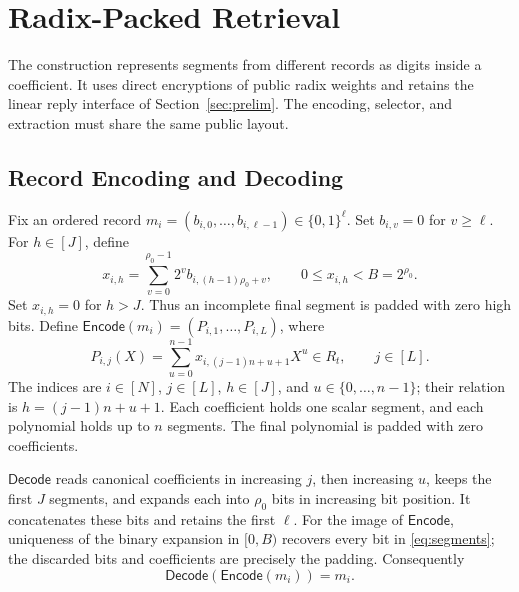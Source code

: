 \section{Radix-Packed Retrieval}
\label{sec:proposal}
The construction represents segments from different records as digits
inside a coefficient. It uses direct encryptions of public radix weights
and retains the linear reply interface of Section~\ref{sec:prelim}.
The encoding, selector, and extraction must share the same public layout.
\subsection{Record Encoding and Decoding}
\label{sec:encoding}
Fix an ordered record \(m_i=(b_{i,0},\ldots,b_{i,\ell-1})\in\{0,1\}^{\ell}\).
Set \(b_{i,v}=0\) for \(v\ge\ell\). For \(h\in[J]\), define
\begin{equation}
\label{eq:segments}
 x_{i,h}=\sum_{v=0}^{\rho_0-1}2^v b_{i,(h-1)\rho_0+v},\qquad
 0\le x_{i,h}<B=2^{\rho_0}.
\end{equation}
Set \(x_{i,h}=0\) for \(h>J\). Thus an incomplete final segment is padded
with zero high bits. Define \(\mathsf{Encode}(m_i)=(P_{i,1},\ldots,P_{i,L})\),
where
\begin{equation}
\label{eq:encode}
 P_{i,j}(X)=\sum_{u=0}^{n-1}x_{i,(j-1)n+u+1}X^u\in R_t,
 \qquad j\in[L].
\end{equation}
The indices are \(i\in[N]\), \(j\in[L]\), \(h\in[J]\), and
\(u\in\{0,\ldots,n-1\}\); their relation is \(h=(j-1)n+u+1\).
Each coefficient holds one scalar segment, and each polynomial holds up to
\(n\) segments. The final polynomial is padded with zero coefficients.

\(\mathsf{Decode}\) reads canonical coefficients in increasing \(j\), then
increasing \(u\), keeps the first \(J\) segments, and expands each into
\(\rho_0\) bits in increasing bit position. It concatenates these bits and
retains the first \(\ell\). For the image of \(\mathsf{Encode}\), uniqueness
of the binary expansion in \([0,B)\) recovers every bit in
\eqref{eq:segments}; the discarded bits and coefficients are precisely the
padding. Consequently
\[
 \mathsf{Decode}(\mathsf{Encode}(m_i))=m_i.
\]

